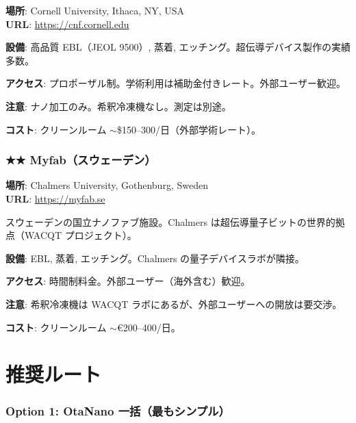 \documentclass[12pt,a4paper]{article}
\begin{document}
\begin{facbox}
\textbf{場所}: Cornell University, Ithaca, NY, USA\\
\textbf{URL}: \url{https://cnf.cornell.edu}

\textbf{設備}: 高品質 EBL（JEOL 9500）, 蒸着, エッチング。超伝導デバイス製作の実績多数。

\textbf{アクセス}: プロポーザル制。学術利用は補助金付きレート。外部ユーザー歓迎。

\textbf{注意}: ナノ加工のみ。希釈冷凍機なし。測定は別途。

\textbf{コスト}: クリーンルーム $\sim$\$150--300/日（外部学術レート）。
\end{facbox}

\section{★★ Myfab（スウェーデン）}

\begin{facbox}
\textbf{場所}: Chalmers University, Gothenburg, Sweden\\
\textbf{URL}: \url{https://myfab.se}

スウェーデンの国立ナノファブ施設。Chalmers は超伝導量子ビットの世界的拠点（WACQT プロジェクト）。

\textbf{設備}: EBL, 蒸着, エッチング。Chalmers の量子デバイスラボが隣接。

\textbf{アクセス}: 時間制料金。外部ユーザー（海外含む）歓迎。

\textbf{注意}: 希釈冷凍機は WACQT ラボにあるが、外部ユーザーへの開放は要交渉。

\textbf{コスト}: クリーンルーム $\sim$€200--400/日。
\end{facbox}

\part{推奨ルート}

\section{Option 1: OtaNano 一括（最もシンプル）}
\end{document}
